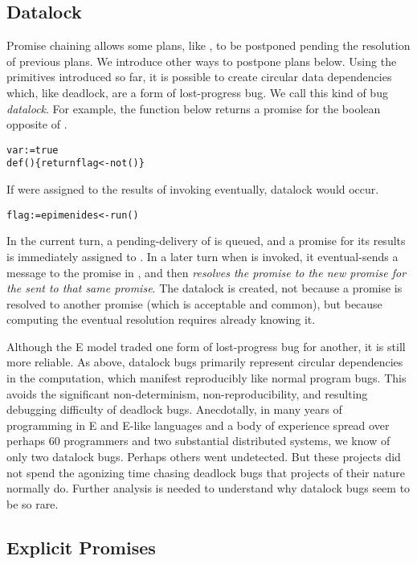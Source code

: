 \documentclass{llncs}
\begin{document}
\subsection{Datalock}

Promise chaining allows some plans, like , to be postponed
pending the resolution of previous plans. We introduce other ways to
postpone plans below.  Using the primitives introduced so far, it is
possible to create circular data dependencies which, like deadlock,
are a form of lost-progress bug. We call this kind of bug
\emph{datalock}.  For example, the  function below
returns a promise for the boolean opposite of .
%
\begin{alltt}
    var  := true
    def () \{ return flag <- not() \}
\end{alltt}
%
If  were assigned to the results of invoking
 eventually, datalock would occur.
%
\begin{alltt}
    flag := epimenides <- run()
\end{alltt}
%
In the current turn, a pending-delivery of 
is queued, and a promise for its results is immediately assigned to
.  In a later turn when  is invoked, it
eventual-sends a message to the promise in , and then
\emph{resolves the  promise to the new promise for the
 sent to that same  promise}.  The datalock is
created, not because a promise is resolved to another promise (which
is acceptable and common), but because computing the eventual
resolution requires already knowing it.

Although the E model traded one form of lost-progress bug for another,
it is still more reliable. As above, datalock bugs primarily represent
circular dependencies in the computation, which manifest reproducibly
like normal program bugs. This avoids the significant non-determinism,
non-reproducibility, and resulting debugging difficulty of deadlock
bugs. Anecdotally, in many years of programming in E and E-like
languages and a body of experience spread over perhaps 60 programmers
and two substantial distributed systems, we know of only two datalock
bugs. Perhaps others went undetected. But these projects did not spend
the agonizing time chasing deadlock bugs that projects of their nature
normally do.  Further analysis is needed to understand why datalock
bugs seem to be so rare.

\subsection{Explicit Promises}
\end{document}
